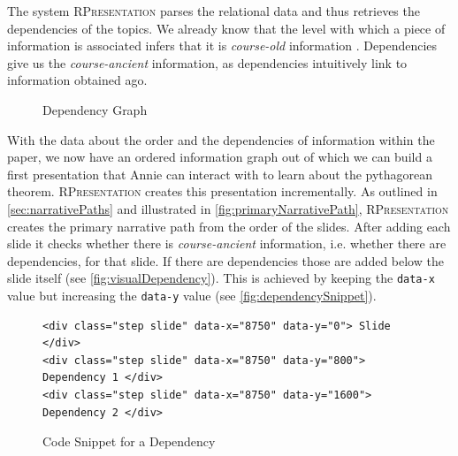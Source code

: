 \documentclass[twoside, 12pt]{article}
\newcommand{\sys}{\textsc{RPresentation}\xspace}
\begin{document}

The system \sys parses the relational data and thus retrieves the dependencies of the topics. We already know that the level with which a piece of information is associated infers that it is \textit{course-old} information . Dependencies give us the \textit{course-ancient} information, as dependencies intuitively link to information obtained ago.\\

\begin{figure}
\vspace{-26pt}
  \begin{center}
\vspace{-20pt}
  \caption{Dependency Graph}
  \label{fig:depGraphPythagoreanFull}
\vspace{12pt}
  \end{center}
\end{figure}

\begin{figure}
\vspace{-50pt}
\end{figure}

With the data about the order and the dependencies of information within the paper, we now have an ordered information graph out of which we can build a first presentation that Annie can interact with to learn about the pythagorean theorem. \sys creates this presentation incrementally. As outlined in \autoref{sec:narrativePaths} and illustrated in \autoref{fig:primaryNarrativePath}, \sys creates the primary narrative path from the order of the slides. After adding each slide it checks whether there is \textit{course-ancient} information, i.e. whether there are dependencies, for that slide. If there are dependencies those are added below the slide itself (see \autoref{fig:visualDependency}). This is achieved by keeping the \texttt{data-x} value but increasing the \texttt{data-y} value (see \autoref{fig:dependencySnippet}).

\begin{figure}
\vspace{-0pt}
\begin{verbatim}
<div class="step slide" data-x="8750" data-y="0"> Slide </div>
<div class="step slide" data-x="8750" data-y="800"> Dependency 1 </div>
<div class="step slide" data-x="8750" data-y="1600"> Dependency 2 </div>
\end{verbatim}
\vspace{-8pt}
  \caption{Code Snippet for a Dependency}
  \label{fig:dependencySnippet}
  \vspace{12pt}
\end{figure}
\end{document}
